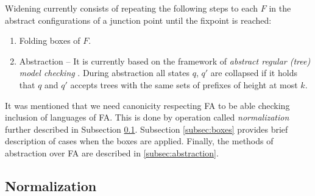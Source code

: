 Widening currently consists of repeating the following steps to each $F$ in the abstract configurations of a junction point until the fixpoint is reached:
\begin{enumerate}
		\item Folding boxes of $F$.
		\item Abstraction -- It is currently based on the framework of \emph{abstract regular (tree) model checking} \cite{artmc}.
			During abstraction all states $q$, $q'$ are collapsed if it holds that
			$q$ and $q'$ accepts trees with the same sets of prefixes of height at most $k$.
\end{enumerate}

It was mentioned that we need canonicity respecting FA to be able checking inclusion of languages of FA.
This is done by operation called \emph{normalization} further described in Subsection \ref{subsec:norm}.
Subsection \ref{subsec:boxes} provides brief description of cases when the boxes are applied.
Finally, the methods of abstraction over FA are described in \ref{subsec:abstraction}.

\subsection{Normalization}
\label{subsec:norm}

